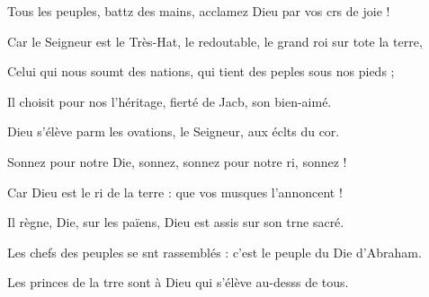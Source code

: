\item Tous les peuples, battz des mains,\psstar{} acclamez Dieu par vos crs de joie !
\item Car le Seigneur est le Très-Hat, le redoutable,\psstar{} le grand roi sur tote la terre,
\item Celui qui nous soumt des nations,\psstar{} qui tient des peples sous nos pieds ;
\item Il choisit pour nos l’héritage,\psstar{} fierté de Jacb, son bien-aimé.
\item Dieu s’élève parm les ovations,\psstar{} le Seigneur, aux éclts du cor.
\item Sonnez pour notre Die, sonnez,\psstar{} sonnez pour notre ri, sonnez !
\item Car Dieu est le ri de la terre :\psstar{} que vos musques l’annoncent !
\item Il règne, Die, sur les païens,\psstar{} Dieu est assis sur son trne sacré.
\item Les chefs des peuples se snt rassemblés :\psstar{} c’est le peuple du Die d’Abraham.
\item Les princes de la trre sont à Dieu\psstar{} qui s’élève au-desss de tous.